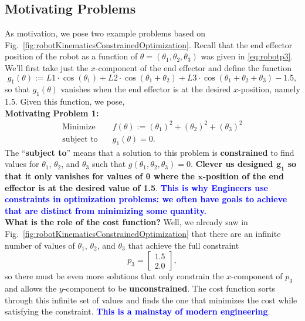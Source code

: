 \subsection{Motivating Problems}

As motivation, we pose two example problems based on Fig.~\ref{fig:robotKinematicsConstrainedOptimization}. Recall that the end effector position of the robot as a function of $\theta = (\theta_1, \theta_2, \theta_3)$ was given in \eqref{eq:robotp3}. We'll first take just the $x$-component of the end effector and define the function
\begin{equation}
    g_1(\theta) :=  L1 \cdot \cos(\theta_1) + L2 \cdot \cos(\theta_1 + \theta_2) + L3 \cdot \cos(\theta_1 + \theta_2 + \theta_3) - \bm{1.5},
\end{equation}
so that $g_1(\theta) $ vanishes when the end effector is at the desired $x$-position, namely $\bm{1.5}$. Given this function, we pose, \\

\textbf{Motivating Problem 1:}
\begin{equation}
\begin{aligned}
\text{Minimize} \quad & f(\theta) := (\theta_1)^2 +  (\theta_2)^2 +  (\theta_3)^2\\
\text{subject to} \quad & g_1(\theta) = 0.
\end{aligned}    
\end{equation}
The ``\textbf{subject to}'' means that a solution to this problem is \textbf{constrained} to find values for $\theta_1$, $\theta_2$, and $\theta_3$ such that $g(\theta_1, \theta_2, \theta_3) = 0$. \textbf{Clever us designed $\bm{g_1}$ so that it only vanishes for values of $\bm{\theta}$ where the $\bm{x}$-position of the end effector is at the desired value of 1.5}. \textcolor{blue}{\bf This is why Engineers use constraints in optimization problems: we often have goals to achieve that are distinct from minimizing some quantity.}\\

\textbf{What is the role of the cost function?} Well, we already saw in Fig.~\ref{fig:robotKinematicsConstrainedOptimization} that there are an infinite number of values of $\theta_1$, $\theta_2$, and $\theta_3$ that achieve the full constraint 
$$p_3 = \left[ \begin{array}{c} 1.5 \\  2.0  \end{array} \right], $$
so there must be even more solutions that only constrain the $x$-component of $p_3$ and allows the $y$-component to be \textbf{unconstrained}. The cost function sorts through this infinite set of values and finds the one that minimizes the cost while satisfying the constraint. \textcolor{blue}{\bf This is a mainstay of modern engineering}. \\

